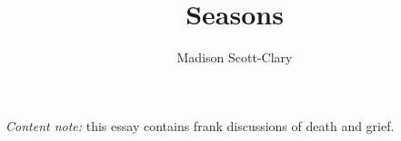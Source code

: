 \documentclass[12pt,oneside]{memoir}
\title{Seasons}
\author{Madison Scott-Clary}
\begin{document}
\OnehalfSpacing

\maketitle

\begin{center}
  \footnotesize \emph{Content note:} this essay contains frank discussions of death and grief.\normalsize
\end{center}

\vskip1cm




\printbibliography
\end{document}
